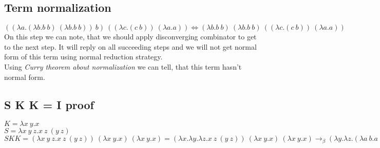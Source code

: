 \documentclass[12 pt, a4paper]{article}
\begin{document}
\subsection*{Term normalization}
\( ((\lambda a .(\lambda b . b\ b)\ (\lambda b . b\ b))\ b)\ ((\lambda c .(c\ b))\ (\lambda a.a)) \Leftrightarrow (\lambda b.b\ b)\ (\lambda b . b\ b)\ ((\lambda c .(c\ b))\ (\lambda a.a))\)
On this step we can note, that we should apply disconverging combinator to get to the next step. It will reply on all succeeding steps and we will not get normal form of this term using normal reduction strategy.\\
Using \textit{Curry theorem about normalization} we can tell, that this term hasn't normal form.
\subsection*{S K K = I proof}
$K = \lambda x\ y.x$\\
$S = \lambda x\ y\ z.x\ z\ (y\ z)$\\
$S K K = (\lambda x\ y\ z.x\ z\ (y\ z))\ (\lambda x\ y.x)\ (\lambda x\ y.x) = (\lambda x.\lambda y.\lambda z.x\ z\ (y\ z))\ (\lambda x\ y.x)\ (\lambda x\ y.x) \rightarrow_\beta (\lambda y.\lambda z.(\lambda a\ b.a)\ z\ (y\ z))\ (\lambda x\ y.x)\rightarrow_\beta \lambda z.(\lambda a\ b.a)\ z\ ((\lambda a\ b.a)\ z) = \lambda z.(\lambda a.\lambda b.a)\ z\ ((\lambda a.\lambda b.a)\ z) \rightarrow_\beta  \lambda z.\lambda b.z\ ((\lambda a.\lambda b.a)\ z \rightarrow_\beta  \lambda z.\lambda b.z\ \lambda b.z \rightarrow_\beta  \lambda z.z = I$ 
\end{document}
